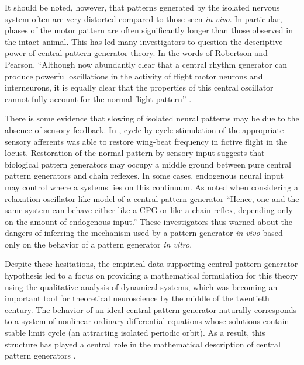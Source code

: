 It should be noted, however, that patterns generated by the isolated nervous
system often are very distorted compared to those seen \textit{in vivo}.  In
particular, phases of the motor pattern are often significantly longer than
those observed in the intact animal.   This has led many
investigators to question the descriptive power of central pattern generator
theory. In the words of Robertson and Pearson, ``Although now abundantly clear
that a central rhythm generator can produce powerful oscillations in the
activity of flight motor neurons and interneurons, it is equally clear that the
properties of this central oscillator cannot fully account for the normal
flight pattern'' \citep{selverston_model_1985}.

There is some evidence that slowing of isolated neural patterns may be due to
the absence of sensory feedback.  In \citet{pearson_phase-dependent_1983}, cycle-by-cycle
stimulation of the appropriate sensory afferents was able to restore wing-beat
frequency in fictive flight in the locust.  
Restoration of the normal pattern by sensory input suggests that biological
pattern generators may occupy a middle ground between pure central pattern
generators and chain reflexes.  In some cases, endogenous neural input may
control where a systems lies on this continuum.   As
\citet{bassler_definition_1986} noted when considering a relaxation-oscillator
like model of a central pattern generator ``Hence, one and the same system can
behave either like a CPG or like a chain reflex, depending only on the amount
of endogenous input.''  These investigators thus warned about the dangers of inferring the
mechanism used by a pattern generator \textit{in vivo} based only on the
behavior of a pattern generator \textit{in vitro}.

Despite these hesitations, the empirical data supporting central pattern
generator hypothesis led to a focus on providing a mathematical formulation
for this theory using the qualitative analysis of dynamical
systems, which was becoming an important tool for theoretical neuroscience by
the middle of the twentieth century. The behavior of an ideal central pattern
generator naturally corresponds to a system of nonlinear ordinary differential
equations whose solutions contain stable limit cycle (an attracting isolated
periodic orbit).  As a result, this structure has played a central role in the
mathematical description of central pattern generators
\citep{ijspeert_central_2008}.

